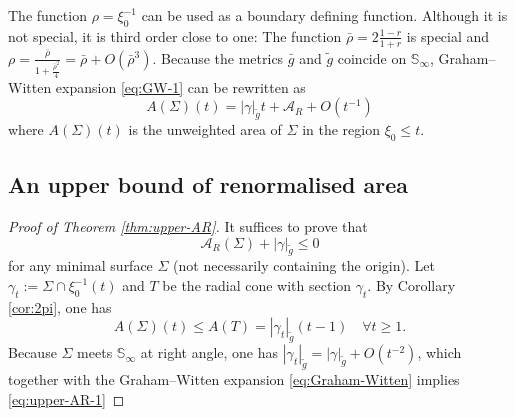 \documentclass[11pt]{article}
\begin{document}
The function \(\rho = \xi_0^{-1}\) can be used as a boundary defining function. Although
it is not special, it is third order close to one:
The function \(\bar\rho = 2 \frac{1-r}{1+r}\) is special and \(\rho =
\frac{\bar\rho}{1 + \frac{\bar\rho^2}{4}}={\bar \rho + O(\bar\rho^3)}\). 
Because the metrics \(\bar g\) and \(\tilde g\) coincide on \(\mathbb{S}_\infty\), Graham--Witten expansion \eqref{eq:GW-1} can be rewritten as
\begin{equation}
\label{eq:Graham-Witten}
 A(\Sigma)(t) = |\gamma|_{\tilde g} t + \mathcal{A}_R + O(t^{-1})
\end{equation}
where \(A(\Sigma)(t)\) is the unweighted area of \(\Sigma\) in the region \(\xi_0\leq
t\).
\subsection{An upper bound of renormalised area}
\label{sec:org77df54b}
\begin{proof}[Proof of Theorem \ref{thm:upper-AR}]
It suffices to prove that 
\begin{equation}
\label{eq:upper-AR-1}
\mathcal{A}_R(\Sigma) + |\gamma|_{\tilde g}\leq 0
\end{equation}
for any minimal surface \(\Sigma\) (not necessarily containing the origin). Let \(\gamma_t
:= \Sigma\cap\xi_0^{-1}(t)\) and \(T\) be the radial cone 
with section \(\gamma_t\). By Corollary \ref{cor:2pi}, one has 
\[
A(\Sigma)(t) \leq A(T) = |\gamma_t|_{\tilde g} (t-1) \quad\forall t \geq 1.
\]
Because \(\Sigma\) meets \(\mathbb{S}_\infty\) at right angle, one has \(\left|\gamma_t\right|_{\tilde g} = |\gamma|_{\tilde g} + O(t^{-2})\), which together with the Graham--Witten expansion \ref{eq:Graham-Witten} implies \eqref{eq:upper-AR-1}
\end{proof}
\end{document}
